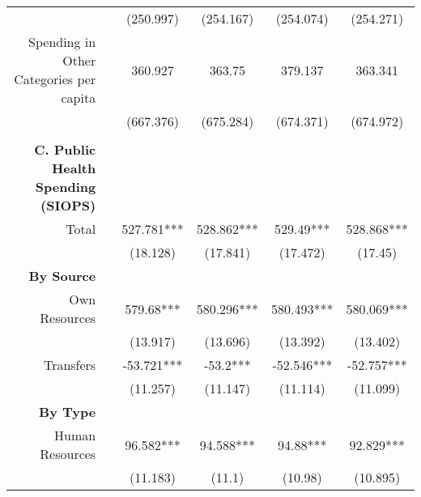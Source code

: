 \begin{table}[h!]
\begin{footnotesize}
\begin{center}
{\begin{threeparttable}[b]
\begin{tabular}{rrrrrr}
          &       & \multicolumn{1}{c}{(250.997)} & \multicolumn{1}{c}{(254.167)} & \multicolumn{1}{c}{(254.074)} & \multicolumn{1}{c}{(254.271)} \\
    \multicolumn{1}{p{17.645em}}{Spending in Other Categories per capita} &       & \multicolumn{1}{c}{360.927} & \multicolumn{1}{c}{363.75} & \multicolumn{1}{c}{379.137} & \multicolumn{1}{c}{363.341} \\
          &       & \multicolumn{1}{c}{(667.376)} & \multicolumn{1}{c}{(675.284)} & \multicolumn{1}{c}{(674.371)} & \multicolumn{1}{c}{(674.972)} \\
          &       &       &       &       &  \\
    \midrule
    \multicolumn{1}{p{17.645em}}{\textbf{C. Public Health Spending (SIOPS)}} &       &       &       &       &  \\
    \multicolumn{1}{p{17.645em}}{Total} &       & \multicolumn{1}{c}{527.781***} & \multicolumn{1}{c}{528.862***} & \multicolumn{1}{c}{529.49***} & \multicolumn{1}{c}{528.868***} \\
          &       & \multicolumn{1}{c}{(18.128)} & \multicolumn{1}{c}{(17.841)} & \multicolumn{1}{c}{(17.472)} & \multicolumn{1}{c}{(17.45)} \\
    \multicolumn{1}{p{17.645em}}{\textbf{By Source}} &       &       &       &       &  \\
    \multicolumn{1}{p{17.645em}}{Own Resources} &       & \multicolumn{1}{c}{579.68***} & \multicolumn{1}{c}{580.296***} & \multicolumn{1}{c}{580.493***} & \multicolumn{1}{c}{580.069***} \\
          &       & \multicolumn{1}{c}{(13.917)} & \multicolumn{1}{c}{(13.696)} & \multicolumn{1}{c}{(13.392)} & \multicolumn{1}{c}{(13.402)} \\
    \multicolumn{1}{p{17.645em}}{Transfers} &       & \multicolumn{1}{c}{-53.721***} & \multicolumn{1}{c}{-53.2***} & \multicolumn{1}{c}{-52.546***} & \multicolumn{1}{c}{-52.757***} \\
          &       & \multicolumn{1}{c}{(11.257)} & \multicolumn{1}{c}{(11.147)} & \multicolumn{1}{c}{(11.114)} & \multicolumn{1}{c}{(11.099)} \\
    \multicolumn{1}{p{17.645em}}{\textbf{By Type}} &       &       &       &       &  \\
    \multicolumn{1}{p{17.645em}}{Human Resources} &       & \multicolumn{1}{c}{96.582***} & \multicolumn{1}{c}{94.588***} & \multicolumn{1}{c}{94.88***} & \multicolumn{1}{c}{92.829***} \\
          &       & \multicolumn{1}{c}{(11.183)} & \multicolumn{1}{c}{(11.1)} & \multicolumn{1}{c}{(10.98)} & \multicolumn{1}{c}{(10.895)} \\

\end{tabular}
\end{threeparttable}}
\end{center}
\end{footnotesize}
\end{table}
